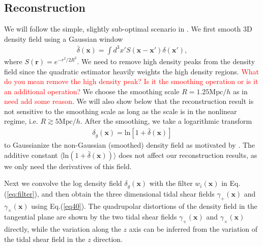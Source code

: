 \documentclass[aps,prd,twocolumn,showpacs,superscriptaddress,groupedaddress,nofootinbib]{revtex4}  %
\newcommand{\mr}{\mathrm}
\begin{document}
\subsection{Reconstruction}
We will follow the simple, slightly sub-optimal scenario in \cite{2012:pen}. 
We first smooth 3D density field using a Gaussian window 
\begin{eqnarray}
\bar{\delta}(\bm{x})=\int d^3x'S(\bm{x}-\bm{x'})\delta(\bm{x}'),
\end{eqnarray}
where $S(\bm{r})=e^{-r^2/2R^2}$.
We need to remove high density peaks from the density field since the 
quadratic estimator heavily weights the high density regions. \textcolor{red}{What do you 
mean remove the high density peak? Is it the smoothing operation or is it an additional operation?}
We choose the smoothing scale $R=1.25\mr{Mpc}/h$ as in \cite{2012:pen} 
\textcolor{red}{need add some reason}. We will also show below that 
the reconstruction result is not sensitive to the smoothing scale as long as 
the scale is in the nonlinear regime, i.e. $R\gtrsim 5\mr{Mpc}/h$. After the smoothing, 
we take a logarithmic transform 
\begin{eqnarray}
\delta_g(\bm{x})=\mr{ln}[1+\bar{\delta}(\bm{x})]
\end{eqnarray}
to Gaussianize the non-Gaussian (smoothed) density field as motivated by 
\cite{2012:log}.
The additive constant $\langle\mr{ln}(1+\bar{\delta}(\bm{x}))\rangle$ does 
not affect our reconstruction results, as we only need the derivatives of this
field.

Next we convolve the log density field $\delta_g(\bm{x})$ with the filter 
$w_i(\bm{x})$ in Eq.(\ref{eq:filter}), 
and then obtain the three dimensional
tidal shear fields $\gamma_+(\bm{x})$ and $\gamma_\times(\bm{x})$ using
Eq.(\ref{eq40}).
The quadrupolar distortions of the density field in the tangential plane are shown by the two tidal shear fields  $\gamma_+(\bm{x})$ and $\gamma_\times(\bm{x})$ directly, while the variation along the  $z$ axis  can be inferred from the variation of the tidal shear field in the $z$ direction.
\end{document}
